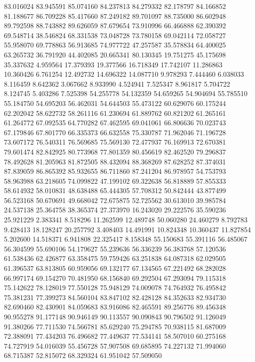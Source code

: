 83.016024
83.945591
85.074160
84.237813
84.279332
82.178797
84.166852
81.188677
86.709228
85.417660
87.249182
89.701097
88.735000
86.602948
89.792598
88.743882
89.626059
87.679654
73.910996
66.466888
62.390392
69.548714
38.546824
68.331538
73.048728
73.780158
69.042114
72.058727
55.958070
69.778863
56.913685
74.977722
47.257587
35.578834
64.400025
63.265732
36.791920
44.402085
20.665341
80.130345
19.751275
45.175698
35.337632
4.959564
17.379393
19.377566
16.718349
17.742107
11.286863
10.360426
6.761254
12.492732
14.696322
14.087710
9.978293
7.444460
6.038033
8.116459
8.642362
3.067662
8.933990
4.524941
7.525347
8.961817
5.704722
8.124745
5.403286
7.525398
54.255778
54.132359
54.659265
54.904694
55.785510
55.184750
54.695203
56.462031
54.644503
55.473122
60.629076
60.175244
62.202042
58.622732
58.261116
61.230694
61.889762
60.821202
61.265161
61.264772
67.092535
64.770282
67.462595
69.041061
66.806636
70.023743
67.179846
67.801770
66.335373
66.632558
75.330787
71.962046
71.196728
73.607172
76.540311
76.569685
75.569130
72.477937
76.169913
72.670381
79.601474
82.842925
80.773968
77.801359
80.456619
82.462520
79.296837
78.492628
81.205963
81.872505
88.432094
88.368269
87.628252
87.374031
87.839059
86.865392
85.932655
86.711860
87.241204
86.978957
54.753793
58.963988
63.218605
74.099822
47.199102
69.322638
56.818889
57.855333
58.614932
58.010831
48.638488
65.444305
57.708312
50.842444
43.877499
56.523168
50.670691
49.668042
72.675875
52.725562
30.613010
39.985784
24.537138
25.364758
38.365374
27.373970
16.243020
29.222576
35.590236
25.921229
2.383341
8.518296
11.262599
12.489748
50.060280
24.460279
8.792783
9.428413
18.128247
20.257792
3.408403
14.491991
10.824348
10.360437
11.827854
5.202600
14.518371
6.941808
22.325417
8.158348
55.150683
55.391116
56.485067
56.304599
55.690106
54.179627
55.239636
56.336239
56.383768
57.120536
61.538436
62.426877
63.358475
59.759426
63.251838
64.087318
62.029505
61.396537
63.813805
60.959056
69.132177
67.134565
67.221492
68.282028
66.997174
69.154270
70.481950
68.156840
69.292504
67.293094
79.115318
75.142622
78.128019
77.550128
75.948129
74.009078
74.764932
76.495842
75.381231
77.399273
84.560104
83.847102
82.428128
84.352633
82.934730
82.690460
82.430901
84.059683
83.916086
82.465591
89.256776
89.456348
90.955278
91.177148
90.946149
90.113557
90.090843
90.796502
91.126049
91.380266
77.711530
74.566781
85.629240
75.294785
70.938115
81.687009
72.388091
77.434203
76.496682
77.449637
77.534141
58.507010
60.275168
74.727919
54.016039
55.456728
57.907508
69.685895
74.227132
71.994060
68.715387
52.815072
68.329324
61.951042
57.509050
